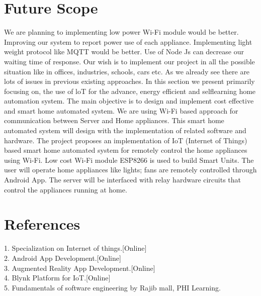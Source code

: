\chapter{Future Scope}
\thispagestyle{fancy}
We are planning to implementing low power Wi-Fi module would be better. Improving our system to report power use of each appliance. Implementing light weight protocol like MQTT would be better. Use of Node Js can decrease our waiting time of response. Our wish is to implement our project in all the possible situation like in offices, industries, schools, cars etc. As we already see there are lots of issues in previous existing approaches. In this section we present primarily focusing on, the use of loT for the advance, energy efficient and selflearning home automation system. The main objective is to design and implement cost effective and smart home automated system. We are using Wi-Fi based approach for communication between Server and Home appliances. This smart home automated system will design with the implementation of related software and hardware. The project proposes an implementation of IoT (Internet of Things) based smart home automated system for remotely control the home appliances using Wi-Fi. Low cost Wi-Fi module ESP8266 is used to build Smart Units. The user will operate home appliances like lights; fans are remotely controlled through Android App. The server will be interfaced with relay hardware circuits that control the appliances running at home.

\chapter{References}
\thispagestyle{fancy}
1. Specialization on Internet of things.[Online]\\
2. Android App Development.[Online]\\
3. Augmented Reality App Development.[Online]\\
4. Blynk Platform for IoT.[Online]\\
5. Fundamentals of software engineering by Rajib mall, PHI Learning.\\